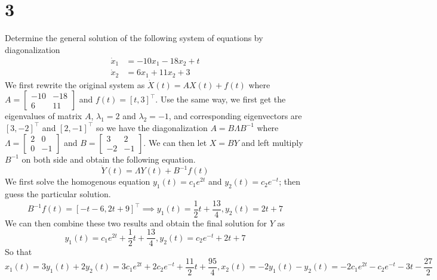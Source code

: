\documentclass{article}
\begin{document}
\section*{3}
\begin{myleftlinebox}
    Determine the general solution of the following system of equations by diagonalization
    \begin{align*}
        \dot x_1 &= -10 x_1-18 x_2+t\\
        \dot x_2 &= 6 x_1 +11 x_2+3
    \end{align*}
    \tcblower
    We first rewrite the original system as \(\dot X(t) = AX(t)+f(t)\) where \(A = \begin{bmatrix}
        -10 & -18\\
        6 & 11
    \end{bmatrix}\) and \(f(t) = [t,3]^\top\). Use the same way, we first get the eigenvalues of matrix \(A\), \(\lambda_1 = 2\) and \(\lambda_2 = -1\), and corresponding eigenvectors are \([3,-2]^\top\) and \([2,-1]^\top\) so we have the diagonalization \(A = B\Lambda B^{-1}\) where \(\Lambda = \begin{bmatrix}
        2 & 0 \\
        0 & -1
    \end{bmatrix}\) and \(B = \begin{bmatrix}
        3 & 2\\
        -2 & -1
    \end{bmatrix}\). We can then let \(X = BY\) and left multiply \(B^{-1}\) on both side and obtain the following equation.
    \begin{equation*}
        \dot Y(t) = \Lambda Y(t)+B^{-1}f(t)
    \end{equation*}
    We first solve the homogenous equation \(y_1(t) = c_1 e^{2t}\) and \(y_2(t)=c_2 e^{-t}\); then guess the particular solution. 
    \begin{equation*}
        B^{-1}f(t) = [-t-6,2t+9]^\top\implies y_1(t) = \frac{1}{2}t+\frac{13}{4}, y_2(t) = 2t+7
    \end{equation*}
    We can then combine these two results and obtain the final solution for \(Y\) as
    \begin{equation*}
        y_1(t) = c_1 e^{2t} +\frac{1}{2}t+\frac{13}{4},y_2(t) = c_2 e^{-t}+ 2t+7
    \end{equation*}
    So that
    \begin{equation*}
        x_1(t) = 3y_1(t)+2y_2(t)= 3c_1 e^{2t}+2c_2 e^{-t} +\frac{11}{2}t+\frac{95}{4}, x_2(t) = -2y_1(t)-y_2(t) = -2c_1 e^{2t}-c_2 e^{-t} -3t-\frac{27}{2}
    \end{equation*}
\end{myleftlinebox}
\end{document}
